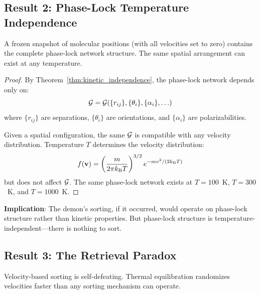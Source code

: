 \subsection{Result 2: Phase-Lock Temperature Independence}

\begin{theorem}
\label{thm:temperature_independence}
A frozen snapshot of molecular positions (with all velocities set to zero) contains the complete phase-lock network structure. The same spatial arrangement can exist at any temperature.
\end{theorem}

\begin{proof}
By Theorem~\ref{thm:kinetic_independence}, the phase-lock network depends only on:
\begin{equation}
\mathcal{G} = \mathcal{G}(\{r_{ij}\}, \{\theta_i\}, \{\alpha_i\}, \ldots)
\end{equation}
where $\{r_{ij}\}$ are separations, $\{\theta_i\}$ are orientations, and $\{\alpha_i\}$ are polarizabilities.

Given a spatial configuration, the same $\mathcal{G}$ is compatible with any velocity distribution. Temperature $T$ determines the velocity distribution:
\begin{equation}
f(\mathbf{v}) = \left(\frac{m}{2\pi k_{\mathrm{B}} T}\right)^{3/2} e^{-m v^2/(2k_{\mathrm{B}} T)}
\end{equation}
but does not affect $\mathcal{G}$. The same phase-lock network exists at $T = 100$~K, $T = 300$~K, and $T = 1000$~K.
\end{proof}

\textbf{Implication}: The demon's sorting, if it occurred, would operate on phase-lock structure rather than kinetic properties. But phase-lock structure is temperature-independent---there is nothing to sort.

\subsection{Result 3: The Retrieval Paradox}

\begin{theorem}
\label{thm:retrieval}
Velocity-based sorting is self-defeating. Thermal equilibration randomizes velocities faster than any sorting mechanism can operate.
\end{theorem}

